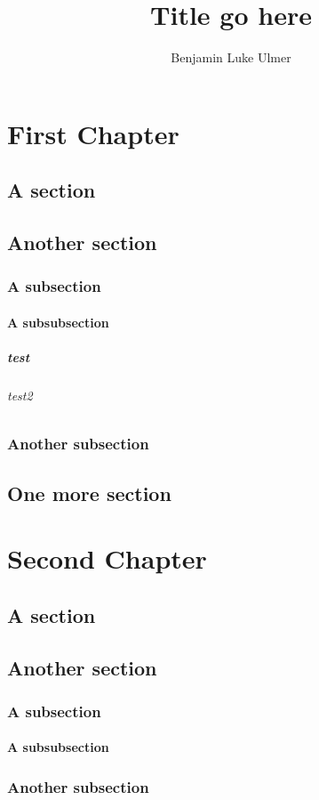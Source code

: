 \documentclass[12pt]{ucalgthes1}
\title{Title go here}
\author{Benjamin Luke Ulmer}
\begin{document}



\chapter{First Chapter}
\section{A section}
\section{Another section}
\subsection{A subsection}
\subsubsection{A subsubsection}
\paragraph{test}
\subparagraph{test2}
\subsection{Another subsection}
\section{One more section}
\chapter{Second Chapter}
\section{A section}
\section{Another section}
\subsection{A subsection}
\subsubsection{A subsubsection}
\subsection{Another subsection}
\end{document}
